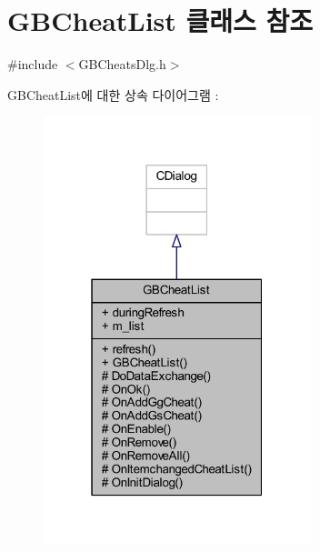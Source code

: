 \hypertarget{class_g_b_cheat_list}{}\section{G\+B\+Cheat\+List 클래스 참조}
\label{class_g_b_cheat_list}


{\ttfamily \#include $<$G\+B\+Cheats\+Dlg.\+h$>$}



G\+B\+Cheat\+List에 대한 상속 다이어그램 \+: \nopagebreak
\begin{figure}[H]
\begin{center}
\leavevmode
\includegraphics[width=220pt]{class_g_b_cheat_list__inherit__graph}
\end{center}
\end{figure}


